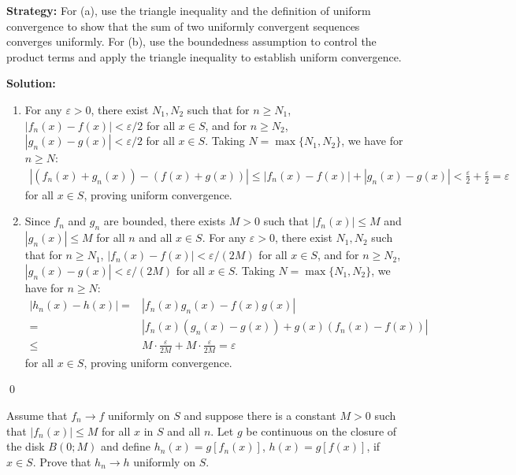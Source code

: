 \noindent\textbf{Strategy:} For (a), use the triangle inequality and the definition of uniform convergence to show that the sum of two uniformly convergent sequences converges uniformly. For (b), use the boundedness assumption to control the product terms and apply the triangle inequality to establish uniform convergence.

\bigskip\noindent\textbf{Solution:}
\begin{enumerate}[label=(\alph*)]
\item For any \( \varepsilon > 0 \), there exist \( N_1, N_2 \) such that for \( n \geq N_1 \), \( |f_n(x) - f(x)| < \varepsilon/2 \) for all \( x \in S \), and for \( n \geq N_2 \), \( |g_n(x) - g(x)| < \varepsilon/2 \) for all \( x \in S \). Taking \( N = \max\{N_1, N_2\} \), we have for \( n \geq N \):
\begin{align*}
|(f_n(x) + g_n(x)) - (f(x) + g(x))| \leq |f_n(x) - f(x)| + |g_n(x) - g(x)| < \frac{\varepsilon}{2} + \frac{\varepsilon}{2} = \varepsilon
\end{align*}
for all \( x \in S \), proving uniform convergence.

\item Since \( f_n \) and \( g_n \) are bounded, there exists \( M > 0 \) such that \( |f_n(x)| \leq M \) and \( |g_n(x)| \leq M \) for all \( n \) and all \( x \in S \). For any \( \varepsilon > 0 \), there exist \( N_1, N_2 \) such that for \( n \geq N_1 \), \( |f_n(x) - f(x)| < \varepsilon/(2M) \) for all \( x \in S \), and for \( n \geq N_2 \), \( |g_n(x) - g(x)| < \varepsilon/(2M) \) for all \( x \in S \). Taking \( N = \max\{N_1, N_2\} \), we have for \( n \geq N \):
\begin{align*}
|h_n(x) - h(x)| =& |f_n(x)g_n(x) - f(x)g(x)| \\
=& |f_n(x)(g_n(x) - g(x)) + g(x)(f_n(x) - f(x))| \\
\leq & M \cdot \frac{\varepsilon}{2M} + M \cdot \frac{\varepsilon}{2M} = \varepsilon
\end{align*}
for all \( x \in S \), proving uniform convergence.
\end{enumerate}\qed


\begin{problembox}
Assume that \( f_n \to f \) uniformly on \( S \) and suppose there is a constant \( M > 0 \) such that \( |f_n(x)| \leq M \) for all \( x \) in \( S \) and all \( n \). Let \( g \) be continuous on the closure of the disk \( B(0; M) \) and define \( h_n(x) = g[f_n(x)] \), \( h(x) = g[f(x)] \), if \( x \in S \). Prove that \( h_n \to h \) uniformly on \( S \).
\end{problembox}

